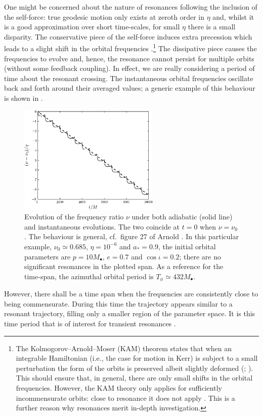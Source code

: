 One might be concerned about the nature of resonances following the inclusion of the self-force: true geodesic motion only exists at zeroth order in $\eta$ and, whilst it is a good approximation over short time-scales, for small $\eta$ there is a small disparity. The conservative piece of the self-force induces extra precession which leads to a slight shift in the orbital frequencies \citep{Warburton2012}.\footnote{The Kolmogorov--Arnold--Moser (KAM) theorem states that when an integrable Hamiltonian (i.e., the case for motion in Kerr) is subject to a small perturbation the form of the orbits is preserved albeit slightly deformed (\citealt{Arnold1963}; \citealt[chapter II, section 3.3 d]{Moser1973}). This should ensure that, in general, there are only small shifts in the orbital frequencies. However, the KAM theory only applies for sufficiently incommensurate orbits: close to resonance it does not apply \citep[chapter V, section 1 c]{Moser1973}. This is a further reason why resonances merit in-depth investigation.} The dissipative piece causes the frequencies to evolve and, hence, the resonance cannot persist for multiple orbits (without some feedback coupling). In effect, we are really considering a period of time about the resonant crossing. The instantaneous orbital frequencies oscillate back and forth around their averaged values; a generic example of this behaviour is shown in .
\begin{figure}%
\centering
\includegraphics[width=0.6\textwidth]{./images/Fig_ad_vs_inst_wibble}
\caption{Evolution of the frequency ratio $\nu$ under both adiabatic (solid line) and instantaneous evolutions. The two coincide at $t = 0$ when $\nu = \nu_0$. The behaviour is general, cf.\ figure 27 of Arnold \citep{Arnold1988}. In this particular example, $\nu_0 \simeq 0.685$, $\eta = 10^{-6}$ and $a_\ast = 0.9$, the initial orbital parameters are $p = 10 M_\bullet$, $e = 0.7$ and $\cos \iota = 0.2$; there are no significant resonances in the plotted span. As a reference for the time-span, the azimuthal orbital period is $T_\phi \simeq 432 M_\bullet$.}\label{fig:wibbles}
\end{figure}
However, there shall be a time span when the frequencies are consistently close to being commensurate. During this time the trajectory appears similar to a resonant trajectory, filling only a smaller region of the parameter space. It is this time period that is of interest for transient resonances \citep{Bosley1992}.

